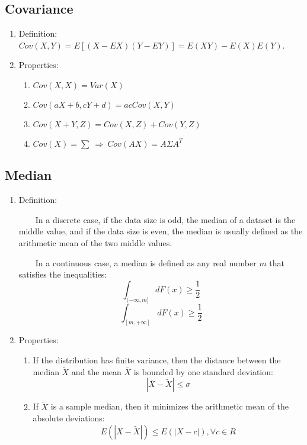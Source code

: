 \documentclass[a4paper]{article}
\begin{document}
\subsection{Covariance}
	\begin{enumerate}
	\item Definition: $Cov(X,Y)=E[(X-EX)(Y-EY)]=E(XY)-E(X)E(Y)$.
	\item Properties:
		\begin{enumerate}
		\item $Cov(X,X)=Var(X)$
		\item $Cov(aX+b,cY+d)=acCov(X,Y)$
		\item $Cov(X+Y,Z)=Cov(X,Z)+Cov(Y,Z)$
		\item $Cov(X)=\sum\ \Rightarrow\ Cov(AX)=A\Sigma A^T$
		\end{enumerate}
	\end{enumerate}


\subsection{Median}
	\begin{enumerate}
	\item Definition: 

\ \ \ \ In a discrete case, if the data size is odd, the median of a dataset is the middle value, and if the data size is even, the median is usually defined as the arithmetic mean of the two middle values.

\ \ \ \ In a continuous case, a median is defined as any real number $m$ that satisfies the inequalities:
$$\int_{(-\infty,m]}dF(x)\geq\frac{1}{2}$$
$$\int_{[m,+\infty]}dF(x)\geq\frac{1}{2}$$
	\item Properties:
		\begin{enumerate}
		\item If the distribution has finite variance, then the distance between the median $\tilde X$ and the mean $\overline{X}$ is bounded by one standard deviation:
$$|\overline{X}-\tilde{X}|\leq\sigma$$
		\item If $\tilde{X}$ is a sample median, then it minimizes the arithmetic mean of the absolute deviations:
$$E(|X-\tilde{X}|)\leq E(|X-c|), \forall c\in R$$
		\end{enumerate}
	\end{enumerate}
\end{document}
